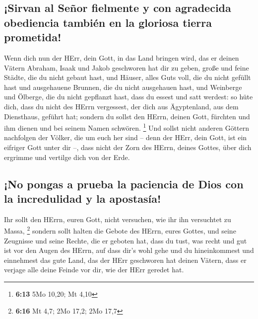 \hypertarget{sirvan-al-seuxf1or-fielmente-y-con-agradecida-obediencia-tambiuxe9n-en-la-gloriosa-tierra-prometida}{%
\subsection{¡Sirvan al Señor fielmente y con agradecida obediencia
también en la gloriosa tierra
prometida!}\label{sirvan-al-seuxf1or-fielmente-y-con-agradecida-obediencia-tambiuxe9n-en-la-gloriosa-tierra-prometida}}

 Wenn dich nun der HErr, dein Gott, in das Land bringen
wird, das er deinen Vätern Abraham, Isaak und Jakob geschworen hat dir
zu geben, große und feine Städte, die du nicht gebaut hast,
 und Häuser, alles Guts voll, die du nicht gefüllt hast
und ausgehauene Brunnen, die du nicht ausgehauen hast, und Weinberge und
Ölberge, die du nicht gepflanzt hast, dass du essest und satt werdest:
 so hüte dich, dass du nicht des HErrn vergessest, der
dich aus Ägyptenland, aus dem Diensthaus, geführt hat; 
sondern du sollst den HErrn, deinen Gott, fürchten und ihm dienen und
bei seinem Namen schwören. \footnote{\textbf{6:13} 5Mo 10,20; Mt 4,10}
 Und sollst nicht anderen Göttern nachfolgen der Völker,
die um euch her sind --  denn der HErr, dein Gott, ist
ein eifriger Gott unter dir --, dass nicht der Zorn des HErrn, deines
Gottes, über dich ergrimme und vertilge dich von der Erde.

\hypertarget{no-pongas-a-prueba-la-paciencia-de-dios-con-la-incredulidad-y-la-apostasuxeda}{%
\subsection{¡No pongas a prueba la paciencia de Dios con la incredulidad
y la
apostasía!}\label{no-pongas-a-prueba-la-paciencia-de-dios-con-la-incredulidad-y-la-apostasuxeda}}

 Ihr sollt den HErrn, euren Gott, nicht versuchen, wie
ihr ihn versuchtet zu Massa, \footnote{\textbf{6:16} Mt 4,7; 2Mo 17,2;
  2Mo 17,7}  sondern sollt halten die Gebote des HErrn,
eures Gottes, und seine Zeugnisse und seine Rechte, die er geboten hat,
 dass du tust, was recht und gut ist vor den Augen des
HErrn, auf dass dir's wohl gehe und du hineinkommest und einnehmest das
gute Land, das der HErr geschworen hat deinen Vätern, 
dass er verjage alle deine Feinde vor dir, wie der HErr geredet hat.

